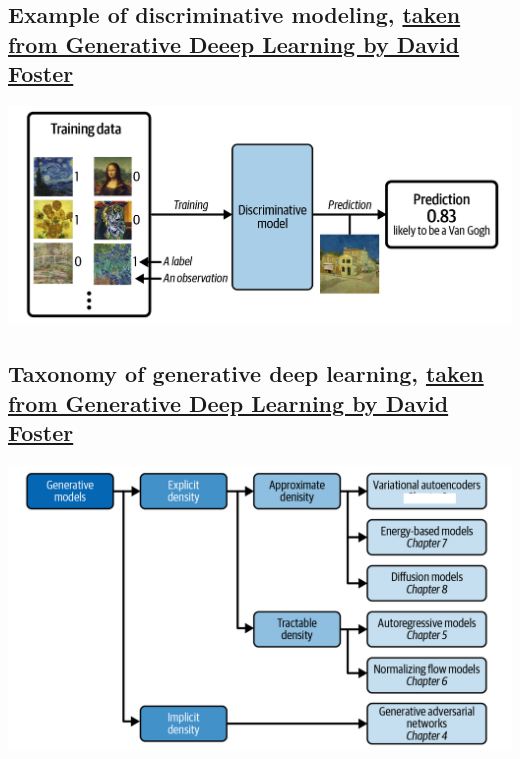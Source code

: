 \documentclass[%
oneside,                 %
final,                   %
10pt]{article}
\begin{document}
\subsection{Example of discriminative modeling, \href{{https://www.oreilly.com/library/view/generative-deep-learning/9781098134174/ch01.html}}{taken from Generative Deeep Learning by David Foster}}

\vspace{6mm}

\centerline{\includegraphics[width=1.0\linewidth]{figures/standarddeeplearning.png}}

\vspace{6mm}

\subsection{Taxonomy of generative deep learning, \href{{https://www.oreilly.com/library/view/generative-deep-learning/9781098134174/ch01.html}}{taken from Generative Deep Learning by David Foster}}

\vspace{6mm}

\centerline{\includegraphics[width=1.0\linewidth]{figures/generativemodels.png}}
\end{document}
